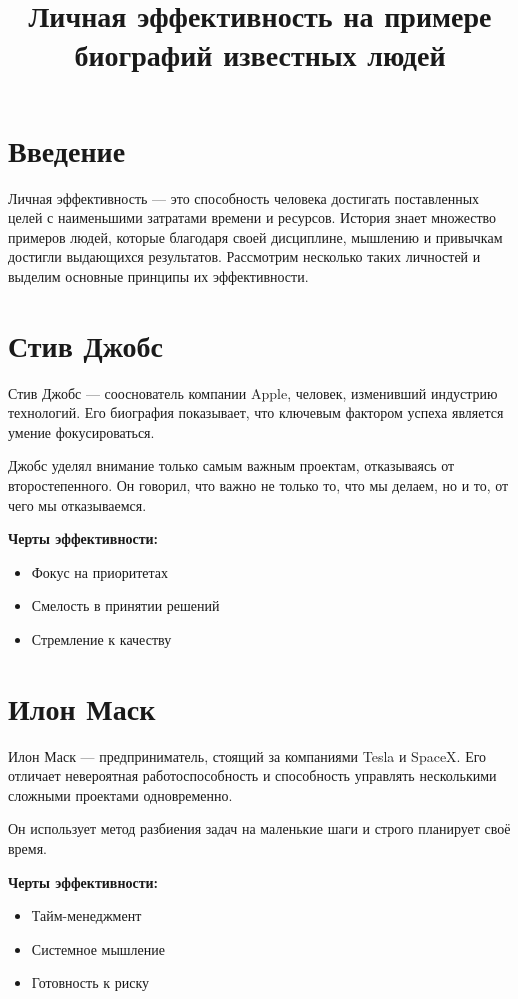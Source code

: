\documentclass[12pt,a4paper]{article}
\title{Личная эффективность на примере биографий известных людей}
\author{ }
\date{}
\begin{document}
\maketitle

\section*{Введение}

Личная эффективность — это способность человека достигать поставленных целей с наименьшими затратами времени и ресурсов. История знает множество примеров людей, которые благодаря своей дисциплине, мышлению и привычкам достигли выдающихся результатов. Рассмотрим несколько таких личностей и выделим основные принципы их эффективности.

\section{Стив Джобс}

Стив Джобс — сооснователь компании Apple, человек, изменивший индустрию технологий. Его биография показывает, что ключевым фактором успеха является умение фокусироваться.

Джобс уделял внимание только самым важным проектам, отказываясь от второстепенного. Он говорил, что важно не только то, что мы делаем, но и то, от чего мы отказываемся.

\textbf{Черты эффективности:}
\begin{itemize}
\item Фокус на приоритетах
\item Смелость в принятии решений
\item Стремление к качеству
\end{itemize}

\section{Илон Маск}

Илон Маск — предприниматель, стоящий за компаниями Tesla и SpaceX. Его отличает невероятная работоспособность и способность управлять несколькими сложными проектами одновременно.

Он использует метод разбиения задач на маленькие шаги и строго планирует своё время.

\textbf{Черты эффективности:}
\begin{itemize}
\item Тайм-менеджмент
\item Системное мышление
\item Готовность к риску
\end{itemize}
\end{document}
